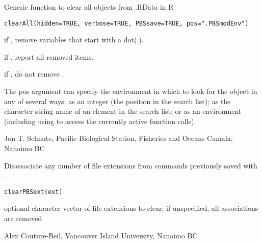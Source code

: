 \documentclass[letterpaper]{book}
\begin{document}
%
\begin{Description}\relax
Generic function to clear all objects from .RData in R
\end{Description}
%
\begin{Usage}
\begin{verbatim}
clearAll(hidden=TRUE, verbose=TRUE, PBSsave=TRUE, pos=".PBSmodEnv")
\end{verbatim}
\end{Usage}
%
\begin{Arguments}
\begin{ldescription}
\item[\code{hidden}] if , remove variables that start with a dot(.).
\item[\code{verbose}] if , report all removed items.
\item[\code{PBSsave}] if , do not remove .
\item[\code{pos}] The pos argument can specify the environment in which to look
for the object in any of several ways: as an integer (the position in
the search list); as the character string name of an element in the
search list; or as an environment (including using  to access
the currently active function calls).
\end{ldescription}
\end{Arguments}
%
\begin{Author}\relax
Jon T. Schnute, Pacific Biological Station, Fisheries and Oceans Canada, Nanaimo BC
\end{Author}
%
\begin{Description}\relax
Disassociate any number of file extensions from commands previously saved
with .
\end{Description}
%
\begin{Usage}
\begin{verbatim}
clearPBSext(ext)
\end{verbatim}
\end{Usage}
%
\begin{Arguments}
\begin{ldescription}
\item[\code{ext}] optional character vector of file extensions to clear; if
unspecified, all associations are removed
\end{ldescription}
\end{Arguments}
%
\begin{Author}\relax
Alex Couture-Beil, Vancouver Island University, Nanaimo BC
\end{Author}
\end{document}
